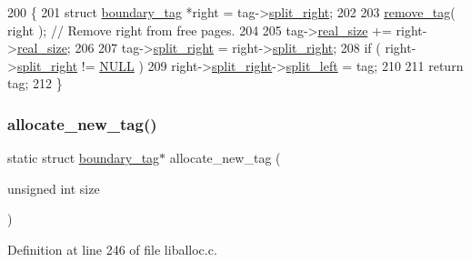 \begin{DoxyCode}
200 \{
201     \textcolor{keyword}{struct }\hyperlink{a00095}{boundary\_tag} *right = tag->\hyperlink{a00095_a9d43c9c4ff5ae35908dcfed0aec1907a_a9d43c9c4ff5ae35908dcfed0aec1907a}{split\_right};
202 
203         \hyperlink{a00023_aeea23ead928f2a5d40fdf7687b3c99c9_aeea23ead928f2a5d40fdf7687b3c99c9}{remove\_tag}( right );      \textcolor{comment}{// Remove right from free pages.}
204 
205         tag->\hyperlink{a00095_ad22b1c69bdce419783ac165f7f354245_ad22b1c69bdce419783ac165f7f354245}{real\_size}   += right->\hyperlink{a00095_ad22b1c69bdce419783ac165f7f354245_ad22b1c69bdce419783ac165f7f354245}{real\_size};
206 
207         tag->\hyperlink{a00095_a9d43c9c4ff5ae35908dcfed0aec1907a_a9d43c9c4ff5ae35908dcfed0aec1907a}{split\_right}  = right->\hyperlink{a00095_a9d43c9c4ff5ae35908dcfed0aec1907a_a9d43c9c4ff5ae35908dcfed0aec1907a}{split\_right};
208         \textcolor{keywordflow}{if} ( right->\hyperlink{a00095_a9d43c9c4ff5ae35908dcfed0aec1907a_a9d43c9c4ff5ae35908dcfed0aec1907a}{split\_right} != \hyperlink{a00026_a070d2ce7b6bb7e5c05602aa8c308d0c4_a070d2ce7b6bb7e5c05602aa8c308d0c4}{NULL} )
209                     right->\hyperlink{a00095_a9d43c9c4ff5ae35908dcfed0aec1907a_a9d43c9c4ff5ae35908dcfed0aec1907a}{split\_right}->\hyperlink{a00095_a4daa8c3768359ea8d0f46ef907616cc2_a4daa8c3768359ea8d0f46ef907616cc2}{split\_left} = tag;
210 
211     \textcolor{keywordflow}{return} tag;
212 \}
\end{DoxyCode}
\mbox{\label{a00023_a8e465ea231c950756bcd4e41244c61a1_a8e465ea231c950756bcd4e41244c61a1}} 
\subsubsection{\texorpdfstring{allocate\+\_\+new\+\_\+tag()}{allocate\_new\_tag()}}
{\footnotesize\ttfamily static struct \hyperlink{a00095}{boundary\+\_\+tag}$\ast$ allocate\+\_\+new\+\_\+tag (\begin{DoxyParamCaption}\item[{unsigned int}]{size }\end{DoxyParamCaption})\hspace{0.3cm}{\ttfamily [static]}}



Definition at line 246 of file liballoc.\+c.


